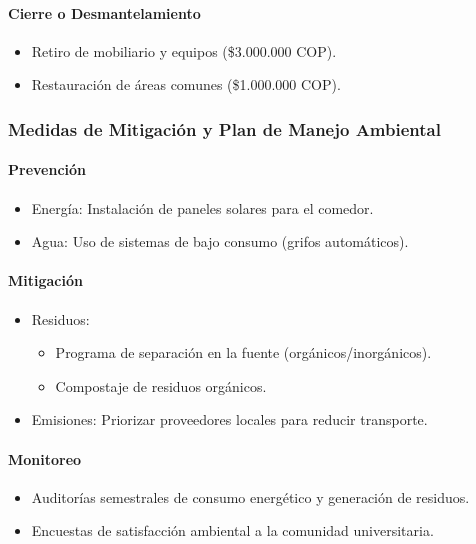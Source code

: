 \documentclass[letterpaper, 11pt]{report}
\begin{document}
\paragraph{Cierre o Desmantelamiento}
\begin{itemize}
      \item Retiro de mobiliario y equipos (\$3.000.000 COP).
      \item Restauración de áreas comunes (\$1.000.000 COP).
\end{itemize}

\subsubsection{Medidas de Mitigación y Plan de Manejo Ambiental}

\paragraph{Prevención}
\begin{itemize}
      \item Energía: Instalación de paneles solares para el comedor.
      \item Agua: Uso de sistemas de bajo consumo (grifos automáticos).
\end{itemize}

\paragraph{Mitigación}
\begin{itemize}
      \item Residuos:
            \begin{itemize}
                  \item Programa de separación en la fuente (orgánicos/inorgánicos).
                  \item Compostaje de residuos orgánicos.
            \end{itemize}
      \item Emisiones: Priorizar proveedores locales para reducir transporte.
\end{itemize}

\paragraph{Monitoreo}
\begin{itemize}
      \item Auditorías semestrales de consumo energético y generación de residuos.
      \item Encuestas de satisfacción ambiental a la comunidad universitaria.
\end{itemize}
\end{document}
